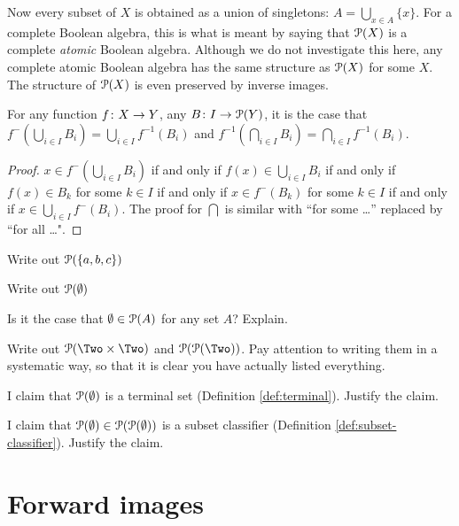 Now every subset of $X$ is obtained as a union of singletons: $A = \bigcup_{x\in A}\{x\}$. 
For a complete Boolean algebra, this is what is meant by saying that ${\mathcal{P}}(X)$ is a complete \emph{atomic} Boolean algebra. 
Although we do not investigate this here, any complete atomic Boolean algebra has the same structure as ${\mathcal{P}}(X)$ for some $X$. The structure of ${\mathcal{P}}(X)$ is even preserved by inverse images.

\begin{lemma}
	For any function ${f}\colon{X}\to{Y}$, any ${B}\colon{I}\to{{\mathcal{P}}(Y)}$, it is the case that $f^{-}(\bigcup_{i\in I}B_i) = \bigcup_{i\in I}f^{-1}(B_i)$
	and $f^{-1}(\bigcap_{i\in I}B_i) = \bigcap_{i\in I}f^{-1}(B_i)$.
	
	\begin{proof}
		$x\in f^{-}(\bigcup_{i\in I}B_i)$ if and only if $f(x)\in \bigcup_{i\in I}B_i$ if and only if $f(x)\in B_k$ for some $k\in I$ if and only if $x\in f^{-}(B_k)$ for some $k\in I$ if and only if $x\in \bigcup_{i\in I}f^{-}(B_i)$.
		The proof for $\bigcap$ is similar with ``for some \ldots'' replaced by ``for all \ldots".  
	\end{proof}
\end{lemma}

\begin{exercises}
	\begin{nextexercise}
		\item Write out ${\mathcal{P}}(\{a,b,c\})$
		\item Write out ${\mathcal{P}}(\emptyset)$
		\item Is it the case that $\emptyset \in {\mathcal{P}}(A)$ for any set $A$? Explain. 
		\item Write out $\powerset(\Two\times \Two)$ and $\powerset(\powerset(\Two))$. Pay attention to writing them in a systematic way, so that it is clear you have actually listed everything.
		\item I claim that ${\mathcal{P}}(\emptyset)$ is a terminal set (Definition \ref{def:terminal}). Justify the claim.
		\item I claim that ${\mathcal{P}}(\emptyset)\in {\mathcal{P}}({\mathcal{P}}(\emptyset))$ is a subset classifier (Definition \ref{def:subset-classifier}). Justify the claim.
	\end{nextexercise}
\end{exercises}

\section{Forward images}

